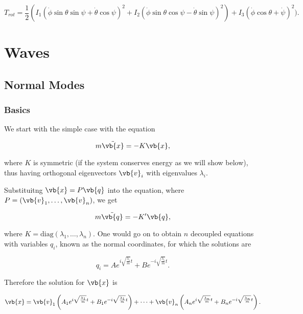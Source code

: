 \documentclass[a4paper,12pt]{report}
\begin{document}
\begin{equation}
	T_{rot} = \frac{1}{2} (I_1(\dot{\phi } \sin \theta \sin \psi + \dot{\theta } \cos \psi )^2 + I_2(\dot{\phi } \sin \theta \cos \psi -\dot{\theta } \sin \psi )^2) + I_3(\dot{\phi } \cos \theta + \dot{\psi } )^2).
\end{equation}

\chapter{Waves}

\section{Normal Modes}

\subsection{Basics}

We start with the simple case with the equation

\begin{equation}
    m \ddot{\vb{x} } = -K\vb{x}, \label{normal} 
\end{equation}

where \(K\) is symmetric (if the system conserves energy as we will show below), thus having orthogonal eigenvectors \(\vb{v} _{i} \) with eigenvalues \(\lambda _{i} \).

Substituitng \(\vb{x} = P \vb{q} \) into the equation, where \(P = (\vb{v} _{1},\ldots ,\vb{v} _{n}   )\), we get

\begin{equation}
    m \ddot{\vb{q} } = -K'\vb{q},
\end{equation}

where \(K = \text{diag}(\lambda _{1}, \ldots , \lambda _{n})\). One would go on to obtain \(n\) decoupled equations with variables \(q_{i}\), known as the normal coordinates, for which the solutions are 

\begin{equation}
	q_{i} = Ae^{i\sqrt{\frac{\lambda _{i} }{m} } t} + Be^{-i\sqrt{\frac{\lambda _{i} }{m} } t}.  
\end{equation}

Therefore the solution for \(\vb{x} \) is

\begin{equation}
	\vb{x} = \vb{v} _{1}\left(A_1 e^{i\sqrt{\frac{\lambda _{1} }{m} } t} + B_1 e^{-i\sqrt{\frac{\lambda _{1} }{m} } t}\right) + \cdots + \vb{v} _{n} \left(A_{n} e^{i\sqrt{\frac{\lambda _{n} }{m} } t} + B_{n} e^{-i\sqrt{\frac{\lambda _{n} }{m} } t}\right).
\end{equation}
\end{document}
